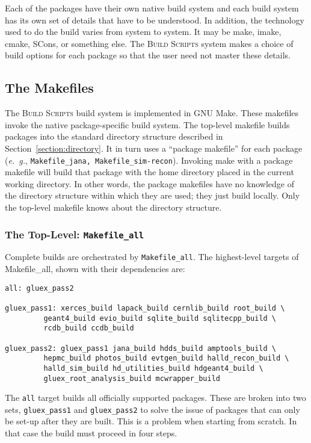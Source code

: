 \documentclass[12pt, letterpaper]{article}
\newcommand{\bs}{\textsc{Build Scripts}}
\begin{document}
Each of the packages have their own native build system and each build
system has its own set of details that have to be understood. In
addition, the technology used to do the build varies from system to
system. It may be make, imake, cmake, SCons, or something else. The
\bs{} system makes a choice of build options for each package so that
the user need not master these details.

\subsection{The Makefiles}

The \bs{} build system is implemented in GNU Make. These makefiles
invoke the native package-specific build system. The top-level
makefile builds packages into the standard directory structure
described in Section~\ref{section:directory}. It in turn uses a
``package
makefile'' for each package ({\it e.~g.}, {\tt Makefile\_jana,
  Makefile\_sim-recon}). Invoking make with a package makefile will
build that package with the home directory placed in the current
working directory. In other words, the package makefiles have no knowledge of
the directory structure within which they are used; they just build
locally. Only the top-level makefile knows about the directory structure.

\subsubsection{The Top-Level: {\tt Makefile\_all}}\label{section:makefile-all}

Complete builds are orchestrated by {\tt Makefile\_all}. The highest-level
targets of Makefile\_all, shown with their dependencies are:

\begin{verbatim}
all: gluex_pass2

gluex_pass1: xerces_build lapack_build cernlib_build root_build \
	     geant4_build evio_build sqlite_build sqlitecpp_build \
	     rcdb_build ccdb_build

gluex_pass2: gluex_pass1 jana_build hdds_build amptools_build \
	     hepmc_build photos_build evtgen_build halld_recon_build \
	     halld_sim_build hd_utilities_build hdgeant4_build \
	     gluex_root_analysis_build mcwrapper_build
\end{verbatim}

The {\tt all} target builds all officially supported packages. These
are broken into two sets, {\tt gluex\_pass1} and {\tt gluex\_pass2} to
solve the issue of packages that can only be set-up after they are
built. This is a problem when starting from scratch. In that case the
build must proceed in four steps.
\end{document}
